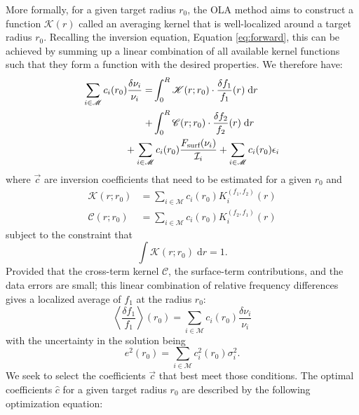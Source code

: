 \documentclass[twocolumn,twocolappendix]{aastex6}
\begin{document}
More formally, for a given target radius $r_0$, the OLA method aims to construct a function $\mathcal{K}(r)$ called an averaging kernel that is well-localized around a target radius $r_0$. Recalling the inversion equation, Equation \ref{eq:forward}, this can be achieved by summing up a linear combination of all available kernel functions such that they form a function with the desired properties. We therefore have:
\begin{align}
    \sum_{i \in \mathscr{M}} c_i(r_0) \frac{\delta\nu_i}{\nu_i}
    =
     &\int_0^R \mathscr{K}(r; r_0) \cdot \frac{\delta f_1}{f_1}(r) \; \text{d}r \notag
\\ +& \int_0^R \mathscr{C}(r; r_0) \cdot \frac{\delta f_2}{f_2}(r) \; \text{d}r \notag
\\ &\hspace{-1cm} + \sum_{i \in \mathscr{M}} c_i(r_0) \frac{F_\text{surf}(\nu_i)}{\mathcal{I}_i} + \sum_{i \in \mathscr{M}} c_i(r_0) \epsilon_i
\end{align}
where $\vec c$ are inversion coefficients that need to be estimated for a given $r_0$ and
\begin{align}
    \mathscr{K}(r; r_0) &= \sum_{i \in \mathscr{M}} c_i(r_0) K_i^{(f_1, f_2)}(r)
\\  \mathscr{C}(r; r_0) &= \sum_{i \in \mathscr{M}} c_i(r_0) K_i^{(f_2, f_1)}(r)
\end{align}
subject to the constraint that 
\begin{equation} \label{eq:sum-to-one}
    \int \mathscr{K}(r; r_0) \; \text{d}r = 1.
\end{equation}
Provided that the cross-term kernel $\mathscr{C}$, the surface-term contributions, and the data errors are small; this linear combination of relative frequency differences gives a localized average of $f_1$ at the radius $r_0$:
\begin{equation} \label{eq:local-avg}
    \left\langle \frac{\delta f_1}{f_1} \right\rangle (r_0) = \sum_{i \in \mathscr{M}} c_i(r_0) \frac{\delta\nu_i}{\nu_i}
\end{equation}
with the uncertainty in the solution being
\begin{equation}
    e^2(r_0) = \sum_{i\in\mathscr{M}} c_i^2(r_0) \sigma_i^2.
\end{equation}
We seek to select the coefficients $\vec c$ that best meet those conditions. The optimal coefficients $\hat c$ for a given target radius $r_0$ are described by the following optimization equation: 
\end{document}
